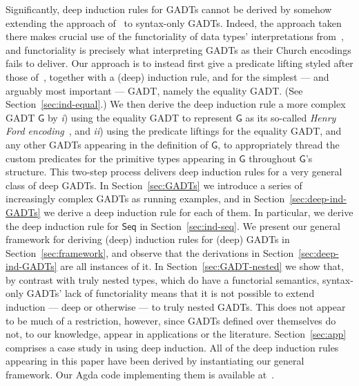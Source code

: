 \documentclass[9pt]{entcs}
\begin{document}
Significantly, deep induction rules for GADTs cannot be derived by
somehow extending the approach of~\cite{jp20} to syntax-only
GADTs. Indeed, the approach taken there makes crucial use of the
functoriality of data types' interpretations from~\cite{jp19}, and
functoriality is precisely what interpreting GADTs as their Church
encodings fails to deliver. Our approach is to instead first give a
predicate lifting styled after those of~\cite{jp20}, together with a
(deep) induction rule, and for the simplest --- and arguably most
important --- GADT, namely the equality GADT. (See
Section~\ref{sec:ind-equal}.)  We then derive the deep induction rule
a more complex GADT $\mathsf{G}$ by {\em i}) using the equality GADT
to represent $\mathsf{G}$ as its so-called {\color{red} {\em Henry Ford
  encoding}}~\cite{ch03,hin03,mcb99,sjsv09,sp04}, and {\em ii}) using
the predicate liftings for the equality GADT, and any other GADTs
appearing in the definition of $\mathsf{G}$, to appropriately thread
the custom predicates for the primitive types appearing in
$\mathsf{G}$ throughout $\mathsf{G}$'s structure. This two-step
process delivers deep induction rules for a very general class of deep
GADTs. In Section~\ref{sec:GADTs} we introduce a series of
increasingly complex GADTs as running examples, and in
Section~\ref{sec:deep-ind-GADTs} we derive a deep induction rule for
each of them. In particular, we derive the deep induction rule for
$\mathsf{Seq}$ in Section~\ref{sec:ind-seq}. We present our general
framework for deriving (deep) induction rules for (deep) GADTs in
Section~\ref{sec:framework}, and observe that the derivations in
Section~\ref{sec:deep-ind-GADTs} are all instances of it.  In
Section~\ref{sec:GADT-nested} we show that, by contrast with truly
nested types, which do have a functorial semantics, syntax-only GADTs'
lack of functoriality means that it is not possible to extend
induction --- deep or otherwise --- to truly nested GADTs. This does
not appear to be much of a restriction, however, since GADTs defined
over themselves do not, to our knowledge, appear in applications or
the literature. Section~\ref{sec:app} comprises a case study in using
deep induction. All of the deep induction rules appearing in this
paper have been derived by instantiating our general framework. Our
Agda code implementing them is available at~\cite{web-page}.

\end{document}
